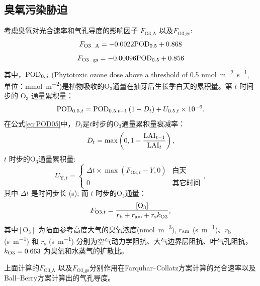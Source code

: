 \subsection{臭氧污染胁迫}
考虑臭氧对光合速率和气孔导度的影响因子 $F_{\mathrm{O3\_A}}$ 以及$F_{\mathrm{O3\_{gs}}}$:
\begin{equation}
  F_{\mathrm{O3\_{A}}}=-0.0022 {\rm POD}_{\mathrm{0.5}}+0.868
\end{equation}
\begin{equation}
  F_{\mathrm{O3\_{gs}}}=-0.00096 {\rm POD}_{\mathrm{0.5}}+0.856
\end{equation}
其中，${\rm POD}_{0.5}$ (Phytotoxic ozone dose above a threshold of 0.5 \unit{nmol.m^{-2}.s^{-1}}, 单位：\unit{mmol.m^{-2}})是植物吸收的$\mathrm {O_3}$通量在抽芽后生长季白天的累积量。第 $t$ 时间步的 $\mathrm{O_3}$ 通量累积量：
\begin{equation}\label{eq:POD05}
  {\rm POD}_{0.5,t}={\rm POD}_{0.5,t-1}\left(1-D_t\right)+U_{0.5,t} \times 10^{-6}.
\end{equation}
在公式\eqref{eq:POD05}中，$D_t$是$t$时步的$\mathrm{O_3}$通量累积量衰减率：
\begin{equation}
  D_t = \max\left(0, 1-\frac{{\rm LAI}_{t-1}}{{\rm LAI}_t} \right),
\end{equation}
$t$ 时步的$\mathrm{O_3}$通量累积量:
\begin{equation}
  U_{\mathrm{Y},t}=\begin{cases}
    \Delta t\times\max(F_{{\mathrm {O3}},t}-Y, 0) & \text{白天} \\
    0 & \text{其它时间}
  \end{cases},
\end{equation}
其中 $\Delta t$ 是时间步长 (s); 而 $t$ 时步的$\mathrm{O_3}$通量：
\begin{equation}
  F_{{\mathrm {O3}},t}=\frac{\mathrm{[O_3]}}{r_{\mathrm {b}}  + r_{\mathrm{am}} + r_{\mathrm s}k_{\rm O3}},
\end{equation}
其中$\mathrm{[O_3]}$ 为陆面参考高度大气的臭氧浓度(\unit{nmol.m^{-3}}), $r_{\rm am}$ (\unit{s.m^{-1}})、$r_{\mathrm {b}} $ (\unit{s.m^{-1}}) 和 $r_{\mathrm {s}} $ (\unit{s.m^{-1}}) 分别为空气动力学阻抗、大气边界层阻抗、叶气孔阻抗，$k_{\rm O3}=0.663$ 为臭氧和水蒸气的扩散比。

上面计算的$F_{\mathrm{{O3}\_A}}$ 以及$F_{\mathrm{O3\_{gs}}}$分别作用在Farquhar--Collatz方案计算的光合速率以及Ball--Berry方案计算出的气孔导度。

